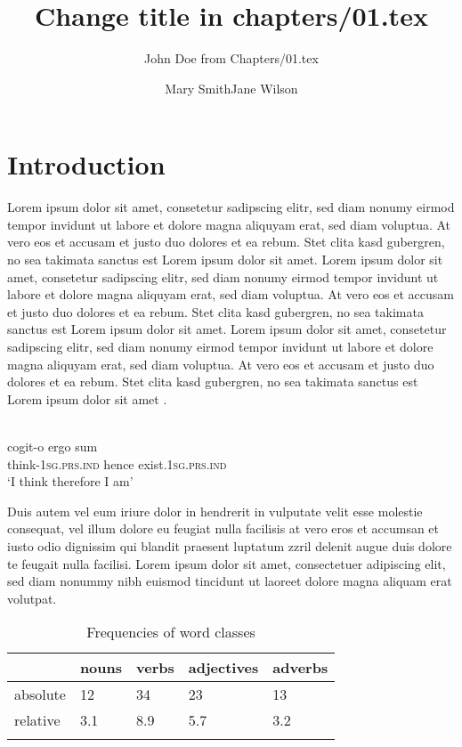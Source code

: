 \documentclass[output=paper]{langscibook}
\author{John Doe from Chapters/01.tex\affiliation{University of Eden}\and Mary Smith\affiliation{University of Pluto}\lastand Jane Wilson\affiliation{National Institute for Language}
}
\title{Change title in chapters/01.tex}
\begin{document}
\maketitle
\section{Introduction} 
 Lorem ipsum dolor sit amet, consetetur sadipscing elitr, sed diam nonumy eirmod tempor invidunt ut labore et dolore magna aliquyam erat, sed diam voluptua. At vero eos et accusam et justo duo dolores et ea rebum. Stet clita kasd gubergren, no sea takimata sanctus est Lorem ipsum dolor sit amet. Lorem ipsum dolor sit amet, consetetur sadipscing elitr, sed diam nonumy eirmod tempor invidunt ut labore et dolore magna aliquyam erat, sed diam voluptua. At vero eos et accusam et justo duo dolores et ea rebum. Stet clita kasd gubergren, no sea takimata sanctus est Lorem ipsum dolor sit amet. Lorem ipsum dolor sit amet, consetetur sadipscing elitr, sed diam nonumy eirmod tempor invidunt ut labore et dolore magna aliquyam erat, sed diam voluptua. At vero eos et accusam et justo duo dolores et ea rebum. Stet clita kasd gubergren, no sea takimata sanctus est Lorem ipsum dolor sit amet \citep{Chomsky1957}.
 
\ea\label{ex:1:descartes}
\\
\gll cogit-o ergo sum \\
     think-1\textsc{sg}.\textsc{prs}.\textsc{ind} hence exist.1\textsc{sg}.\textsc{prs}.\textsc{ind}\\
\glt `I think therefore I am'
\z


Duis autem vel eum iriure dolor in hendrerit in vulputate velit esse molestie consequat, vel illum dolore eu feugiat nulla facilisis at vero eros et accumsan et iusto odio dignissim qui blandit praesent luptatum zzril delenit augue duis dolore te feugait nulla facilisi. Lorem ipsum dolor sit amet, consectetuer adipiscing elit, sed diam nonummy nibh euismod tincidunt ut laoreet dolore magna aliquam erat volutpat. 

\begin{table}
\caption{Frequencies of word classes}
\label{tab:1:frequencies}
 \begin{tabular}{lllll} %
  \lsptoprule
            & nouns & verbs & adjectives & adverbs\\ %
  \midrule
  absolute  &   12  &   34  &    23      & 13\\
  relative  &   3.1 &   8.9 &    5.7     & 3.2\\
  \lspbottomrule
 \end{tabular}
\end{table}
\end{document}
